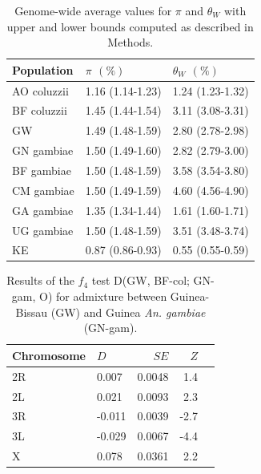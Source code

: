 \documentclass[a4paper,11pt,abstracton,hidelinks]{scrartcl}
\begin{document}
\begin{table}[h]
\begin{center}
\begin{threeparttable}

\caption{Genome-wide average values for $\pi$ and $\theta_{W}$ with upper and lower bounds computed as described in Methods.
}

\label{table:pirange}

\begin{tabular}{lll}
 \hline
 \textbf{Population} & $\pi$ $(\%)$ & $\theta_{W}$  $(\%)$ \\
 \hline
AO coluzzii & 1.16 (1.14-1.23) & 1.24 (1.23-1.32) \\
BF coluzzii & 1.45 (1.44-1.54) & 3.11 (3.08-3.31) \\
GW & 1.49 (1.48-1.59) & 2.80 (2.78-2.98) \\
GN gambiae & 1.50 (1.49-1.60) & 2.82 (2.79-3.00) \\
BF gambiae & 1.50 (1.48-1.59) & 3.58 (3.54-3.80) \\
CM gambiae & 1.50 (1.49-1.59) & 4.60 (4.56-4.90) \\
GA gambiae & 1.35 (1.34-1.44) & 1.61 (1.60-1.71) \\
UG gambiae & 1.50 (1.48-1.59) & 3.51 (3.48-3.74) \\
KE & 0.87 (0.86-0.93) & 0.55 (0.55-0.59) \\
 \hline
\end{tabular}

\end{threeparttable}
\end{center}
\end{table}


\clearpage

\begin{table}[h]
\begin{center}
\begin{threeparttable}

\caption{Results of the $f_4$ test D(GW, BF-col; GN-gam, O) for admixture between Guinea-Bissau (GW) and Guinea \textit{An. gambiae} (GN-gam).
}

\label{table:gwf4}

\begin{tabular}{llrrr}
 \hline
 \textbf{Chromosome} & $D$ & $SE$ & $Z$ \\
 \hline
2R & 0.007 & 0.0048 & 1.4 \\
2L & 0.021 & 0.0093 & 2.3 \\
3R & -0.011 & 0.0039 & -2.7 \\
3L & -0.029 & 0.0067 & -4.4 \\
X & 0.078 & 0.0361 & 2.2 \\
 \hline
\end{tabular}

\end{threeparttable}
\end{center}
\end{table}
\end{document}
